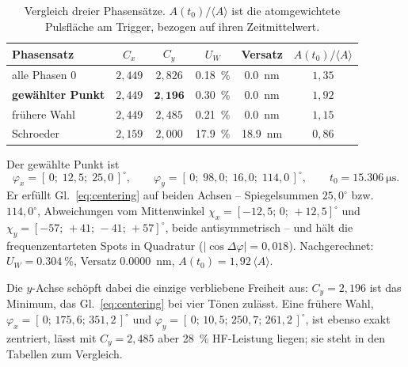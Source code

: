 \documentclass[11pt,a4paper]{article}
\newcommand{\crest}{\ensuremath{C}}
\newcommand{\Uw}{\ensuremath{U_W}}
\begin{document}
\begin{table}[htb]
  \centering
  \caption{Vergleich dreier Phasensätze. $A(t_0)/\langle A\rangle$ ist die
  atomgewichtete Pulsfläche am Trigger, bezogen auf ihren Zeitmittelwert.}
  \label{tab:vergleich}
  \begin{tabular}{lccccc}
    \toprule
    Phasensatz & $\crest_x$ & $\crest_y$ & $\Uw$ & Versatz & $A(t_0)/\langle A\rangle$\\
    \midrule
    alle Phasen $0$ & $2{,}449$ & $2{,}826$ & \SI{0.18}{\percent} & \SI{0.0}{\nano\meter} & $1{,}35$\\
    \textbf{gewählter Punkt} & $2{,}449$ & $\mathbf{2{,}196}$ & \SI{0.30}{\percent} & \SI{0.0}{\nano\meter} & $1{,}92$\\
    frühere Wahl    & $2{,}449$ & $2{,}485$ & \SI{0.21}{\percent} & \SI{0.0}{\nano\meter} & $1{,}15$\\
    Schroeder       & $2{,}159$ & $2{,}000$ & \SI{17.9}{\percent} & \SI{18.9}{\nano\meter} & $0{,}86$\\
    \bottomrule
  \end{tabular}
\end{table}

Der gewählte Punkt ist
\begin{equation}
  \varphi_x=[\,0;\;12{,}5;\;25{,}0\,]^\circ,\qquad
  \varphi_y=[\,0;\;98{,}0;\;16{,}0;\;114{,}0\,]^\circ,\qquad
  t_0=\SI{15.306}{\micro\second}.
  \label{eq:workingpoint}
\end{equation}
Er erfüllt Gl.~\eqref{eq:centering} auf beiden Achsen -- Spiegelsummen
$25{,}0^\circ$ bzw.\ $114{,}0^\circ$, Abweichungen vom Mittenwinkel
$\chi_x=[-12{,}5;\,0;\,+12{,}5]^\circ$ und
$\chi_y=[-57;\,+41;\,-41;\,+57]^\circ$, beide antisymmetrisch -- und hält die
frequenzentarteten Spots in Quadratur ($|\cos\Delta\varphi| = 0{,}018$).
Nachgerechnet: $\Uw=\SI{0.304}{\percent}$, Versatz \SI{0.0000}{\nano\meter},
$A(t_0)=1{,}92\,\langle A\rangle$.

Die $y$-Achse schöpft dabei die einzige verbliebene Freiheit aus:
$\crest_y = 2{,}196$ ist das Minimum, das Gl.~\eqref{eq:centering} bei vier
Tönen zulässt. Eine frühere Wahl,
$\varphi_x=[\,0;\,175{,}6;\,351{,}2\,]^\circ$ und
$\varphi_y=[\,0;\,10{,}5;\,250{,}7;\,261{,}2\,]^\circ$, ist ebenso exakt
zentriert, lässt mit $\crest_y=2{,}485$ aber \SI{28}{\percent} HF-Leistung
liegen; sie steht in den Tabellen zum Vergleich.
\end{document}
